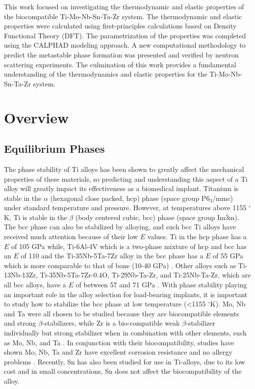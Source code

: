 This work focused on investigating the thermodynamic and elastic properties of the biocompatible Ti-Mo-Nb-Sn-Ta-Zr system. The thermodynamic and elastic properties were calculated using first-principles calculations based on Density Functional Theory (DFT). The parametrization of the properties was completed using the CALPHAD modeling approach. A new computational methodology to predict the metastable phase formation was presented and verified by neutron scattering experiments. The culmination of this work provides a fundamental understanding of the thermodynamics and elastic properties for the Ti-Mo-Nb-Sn-Ta-Zr system.

\section{Overview}

\subsection{Equilibrium Phases}

The phase stability of Ti alloys has been shown to greatly affect the mechanical properties of these materials, so predicting and understanding this aspect of a Ti alloy will greatly impact its effectiveness as a biomedical implant. Titanium is stable in the $\alpha$ (hexagonal close packed, hcp) phase (space group P$6_{3}/$mmc) under standard temperature and pressure. However, at temperatures above 1155 $^{\circ}$K, Ti is stable in the $\beta$ (body centered cubic, bcc) phase (space group Im$\overline{3}$m). The bcc phase can also be stabilized by alloying, and such bcc Ti alloys have received much attention because of their low $E$ values. Ti in the hcp phase has a $E$ of 105 GPa while, Ti-6Al-4V which is a two-phase mixture of hcp and bcc has an $E$ of 110 and the Ti-35Nb-5Ta-7Zr alloy in the bcc phase has a $E$ of 55 GPa which is more comparable to that of bone (10-40 GPa) \cite{Long1998a,Jain2013,Antolin2012,Mei2011,Brailovski2011b}. Other alloys such as Ti-13Nb-13Zr, Ti-35Nb-5Ta-7Zr-0.4O, Ti-29Nb-Ta-Zr, and Ti-25Nb-Ta-Zr, which are all bcc alloys, have a $E$ of between 57 and 71 GPa \cite{Long1998a,Tane2008a,Tane2010a}. With phase stability playing an important role in the alloy selection for load-bearing implants, it is important to study how to stabilize the bcc phase at low temperature (<1155 $^{\circ}$K). Mo, Nb and Ta were all chosen to be studied because they are biocompatible elements and strong $\beta$-stabilizers, while Zr is a bio-compatible weak $\beta$-stabilizer individually but strong stabilizer when in combination with other elements, such as Mo, Nb, and Ta \cite{Long1998a}. In conjunction with their biocompatibility, studies have shown Mo, Nb, Ta and Zr have excellent corrosion resistance and no allergy problems \cite{Tane2008a}. Recently, Sn has also been studied for use in Ti-alloys, due to its low cost \cite{Niinomi2012} and in small concentrations, Sn does not affect the biocompatibility of the alloy. 

